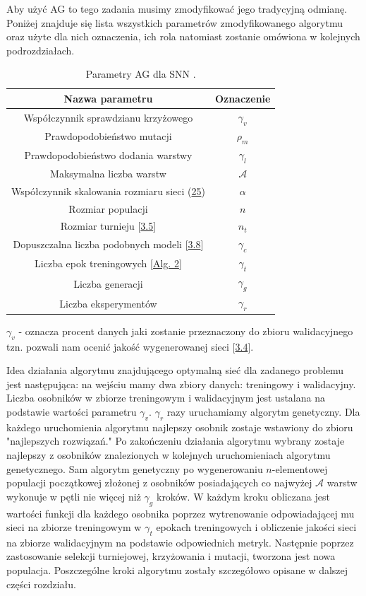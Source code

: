 \documentclass{article}
\begin{document}
Aby użyć AG to tego zadania musimy zmodyfikować jego tradycyjną odmianę.
Poniżej znajduje się lista wszystkich 
parametrów zmodyfikowanego algorytmu oraz użyte dla nich oznaczenia, 
ich rola natomiast zostanie omówiona w kolejnych podrozdziałach.
\begin{table}[H]
\centering
\begin{tabular}{|c|c|}
	\hline
	Nazwa parametru & Oznaczenie \\
	\hline
	Współczynnik sprawdzianu krzyżowego & $\gamma_v$ \\
	Prawdopodobieństwo mutacji & $\rho_m$ \\
	Prawdopodobieństwo dodania warstwy & $\gamma_l$ \\
	Maksymalna liczba warstw & $\mathcal{A}$ \\
	Współczynnik skalowania rozmiaru sieci (\hyperref[eq:cost]{25}) & $\alpha$ \\
	Rozmiar populacji & $n$ \\
	Rozmiar turnieju [\hyperref[sec:turniej]{3.5}] & $n_t$ \\
	Dopuszczalna liczba podobnych modeli [\hyperref[sec:quit]{3.8}] & $\gamma_c$\\
	Liczba epok treningowych [\hyperref[alg:2]{Alg. 2}] & $\gamma_t$\\
	Liczba generacji & $\gamma_g$\\
	Liczba eksperymentów & $\gamma_r$\\
	\hline
\end{tabular}
\caption{\label{tab:params}Parametry AG dla SNN \cite{ams}.}
$\gamma_v$ - oznacza procent danych jaki zostanie przeznaczony do zbioru walidacyjnego
tzn. pozwali nam ocenić jakość wygenerowanej sieci [\hyperref[sec:ocena]{3.4}].
\end{table}
Idea działania algorytmu znajdującego optymalną sieć dla zadanego problemu jest następująca:
na wejściu mamy dwa zbiory danych: treningowy i walidacyjny. 
Liczba osobników w zbiorze treningowym i walidacyjnym jest ustalana na podstawie  wartości parametru $\gamma_v$.
$\gamma_r$ razy uruchamiamy algorytm genetyczny. Dla każdego uruchomienia algorytmu najlepszy
osobnik zostaje wstawiony do zbioru "najlepszych rozwiązań."
Po zakończeniu działania algorytmu wybrany zostaje najlepszy z osobników znalezionych w
kolejnych uruchomieniach algorytmu genetycznego. Sam algorytm genetyczny po wygenerowaniu 
$n$-elementowej populacji początkowej złożonej z osobników posiadających co najwyżej
$\mathcal{A}$ warstw wykonuje w pętli nie więcej niż $\gamma_g$ kroków.
W każdym kroku obliczana jest wartości funkcji dla każdego osobnika poprzez wytrenowanie
odpowiadającej mu sieci na zbiorze treningowym w $\gamma_t$ epokach treningowych i obliczenie
jakości sieci na zbiorze walidacyjnym na podstawie odpowiednich metryk.
Następnie poprzez  zastosowanie selekcji turniejowej, krzyżowania i mutacji, tworzona jest
nowa populacja.
Poszczególne kroki algorytmu zostały szczegółowo opisane w dalszej części rozdziału.
\end{document}

